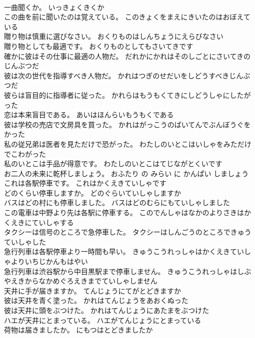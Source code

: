 \documentclass[8pt]{extreport}
\begin{document}
\begin{CJK}{UTF8}{min}
\\	一曲聞くか。	いっきょくきくか 
\\	この曲を前に聞いたのは覚えている。	このきょくをまえにきいたのはおぼえている 
\\	贈り物は慎重に選びなさい。	おくりものはしんちょうにえらびなさい 
\\	贈り物としても最適です。	おくりものとしてもさいてきです 
\\	確かに彼はその仕事に最適の人物だ。	だれかにかれはそのしごとにさいてきのじんぶつだ 
\\	彼は次の世代を指導すべき人物だ。	かれはつぎのせだいをしどうすべきじんぶつだ 
\\	彼らは盲目的に指導者に従った。	かれらはもうもくてきにしどうしゃにしたがった 
\\	恋は本来盲目である。	あいはほんらいもうもくである 
\\	彼は学校の売店で文房具を買った。	かれはがっこうのばいてんでぶんぼうぐをかった 
\\	私の従兄弟は医者を見ただけで恐がった。	わたしのいとこはいしゃをみただけでこわがった 
\\	私のいとこは手品が得意です。	わたしのいとこはてじながとくいです 
\\	お二人の未来に乾杯しましょう。	おふたり の みらい に かんぱい しましょう 
\\	これは各駅停車です。	これはかくえきていしゃです 
\\	どのくらい停車しますか。	どのぐらいていしゃしますか 
\\	バスはどの村にも停車しました。	バスはどのむらにもていしゃしました 
\\	この電車は中野より先は各駅に停車する。	このでんしゃはなかのよりさきはかくえきにていしゃする 
\\	タクシーは信号のところで急停車した。	タクシーはしんごうのところできゅうていしゃした 
\\	急行列車は各駅停車より一時間も早い。	きゅうこうれっしゃはかくえきていしゃよりいちじかんもはやい 
\\	急行列車は渋谷駅から中目黒駅まで停車しません。	きゅうこうれっしゃはしぶやえきからなかめぐろえきまでていしゃしません 
\\	天井に手が届きますか。	てんじょうにてがとどきますか 
\\	彼は天井を青く塗った。	かれはてんじょうをあおくぬった 
\\	彼は天井に頭をぶつけた。	かれはてんじょうにあたまをぶつけた 
\\	ハエが天井にとまっている。	ハエがてんじょうにとまっている 
\\	荷物は届きましたか。	にもつはとどきましたか 

\end{CJK}
\end{document}
